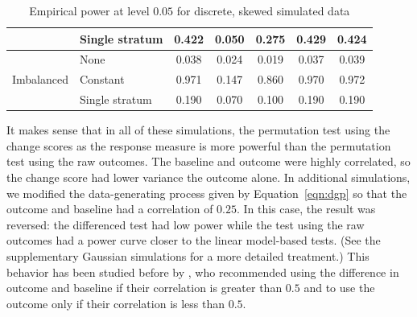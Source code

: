 \documentclass[12pt]{article}
\begin{document}
\begin{table}[]
\begin{tabular}{ll|ccccc}
                            & Single stratum                                              & 0.422                      & 0.050                                                                                & 0.275                                                                                 & 0.429                                                                        & 0.424                                                                        \\ \hline
\multirow{3}{*}{Imbalanced} & None                                                        & 0.038                      & 0.024                                                                                & 0.019                                                                                 & 0.037                                                                        & 0.039                                                                        \\
                            & Constant                                                    & 0.971                      & 0.147                                                                                & 0.860                                                                                 & 0.970                                                                        & 0.972                                                                        \\
                            & Single stratum                                              & 0.190                      & 0.070                                                                                & 0.100                                                                                 & 0.190                                                                        & 0.190                                                                        \\ \hline
\end{tabular}
\caption{Empirical power at level $0.05$ for discrete, skewed simulated data} 
\end{table}
It makes sense that in all of these simulations, the permutation test using the change scores as the response measure is more powerful than the permutation test using the raw outcomes.
The baseline and outcome were highly correlated, so the change score had lower variance the outcome alone. 
In additional simulations, 
we modified the data-generating process given by Equation~\ref{eqn:dgp} so that the outcome and baseline had a correlation of $0.25$.
In this case, the result was reversed: 
the differenced test had low power while the test using the raw outcomes had a power curve closer to the linear model-based tests.
(See the supplementary Gaussian simulations for a more detailed treatment.)
This behavior has been studied before by \cite{frison_repeated_1992}, who recommended using the difference in outcome and baseline if their correlation is greater than $0.5$ and to use the outcome only if their correlation is less than $0.5$.
\end{document}
